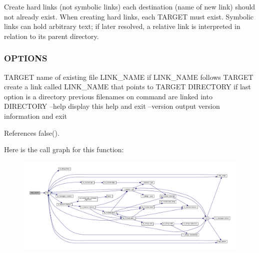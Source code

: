 Create hard links (not symbolic links) each destination (name of new link) should not already exist. When creating hard links, each T\+A\+R\+G\+ET must exist. Symbolic links can hold arbitrary text; if later resolved, a relative link is interpreted in relation to its parent directory. \subsubsection*{O\+P\+T\+I\+O\+NS}

T\+A\+R\+G\+ET name of existing file L\+I\+N\+K\+\_\+\+N\+A\+ME if L\+I\+N\+K\+\_\+\+N\+A\+ME follows T\+A\+R\+G\+ET create a link called L\+I\+N\+K\+\_\+\+N\+A\+ME that points to T\+A\+R\+G\+ET D\+I\+R\+E\+C\+T\+O\+RY if last option is a directory previous filenames on command are linked into D\+I\+R\+E\+C\+T\+O\+RY --help display this help and exit --version output version information and exit 

References false().

Here is the call graph for this function\+:
\nopagebreak
\begin{figure}[H]
\begin{center}
\leavevmode
\includegraphics[width=350pt]{__ln_8f90_a39c21619b08a3c22f19e2306efd7f766_cgraph}
\end{center}
\end{figure}
